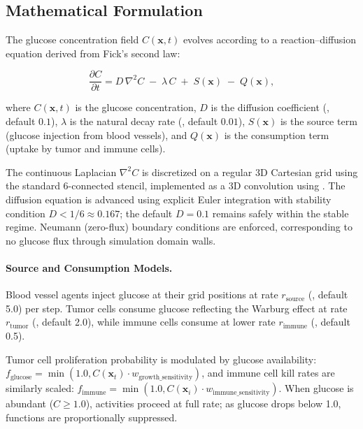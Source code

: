 \subsection{Mathematical Formulation}
\label{sec:glucose-math}

The glucose concentration field $C(\mathbf{x}, t)$ evolves according to a reaction--diffusion equation derived from Fick's second law:

\begin{equation}
\label{eq:glucose-pde}
\frac{\partial C}{\partial t} = D\,\nabla^2 C \;-\; \lambda\,C \;+\; S(\mathbf{x}) \;-\; Q(\mathbf{x}),
\end{equation}

\noindent where $C(\mathbf{x}, t)$ is the glucose concentration, $D$ is the diffusion coefficient (, default $0.1$), $\lambda$ is the natural decay rate (, default $0.01$), $S(\mathbf{x})$ is the source term (glucose injection from blood vessels), and $Q(\mathbf{x})$ is the consumption term (uptake by tumor and immune cells).

The continuous Laplacian $\nabla^2 C$ is discretized on a regular 3D Cartesian grid using the standard 6-connected stencil, implemented as a 3D convolution using . The diffusion equation is advanced using explicit Euler integration with stability condition $D < 1/6 \approx 0.167$; the default $D = 0.1$ remains safely within the stable regime. Neumann (zero-flux) boundary conditions are enforced, corresponding to no glucose flux through simulation domain walls.

\paragraph{Source and Consumption Models.}

Blood vessel agents inject glucose at their grid positions at rate $r_{\text{source}}$ (, default 5.0) per step. Tumor cells consume glucose reflecting the Warburg effect at rate $r_{\text{tumor}}$ (, default 2.0), while immune cells consume at lower rate $r_{\text{immune}}$ (, default 0.5).

Tumor cell proliferation probability is modulated by glucose availability: $f_{\text{glucose}} = \min(1.0, C(\mathbf{x}_t) \cdot w_{\text{growth\_sensitivity}})$, and immune cell kill rates are similarly scaled: $f_{\text{immune}} = \min(1.0, C(\mathbf{x}_i) \cdot w_{\text{immune\_sensitivity}})$. When glucose is abundant ($C \geq 1.0$), activities proceed at full rate; as glucose drops below 1.0, functions are proportionally suppressed.

